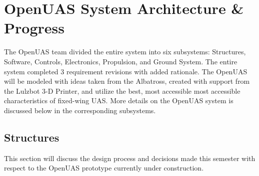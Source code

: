 \documentclass{article}
\begin{document}
\section{OpenUAS System Architecture \& Progress}
\noindent The OpenUAS team divided the entire system into six subsystems: Structures, Software, Controls, Electronics, Propulsion, and Ground System. The entire system completed 3 requirement revisions with added rationale. The OpenUAS will be modeled with ideas taken from the Albatross, created with support from the Lulzbot 3-D Printer, and utilize the best, most accessible most accessible characteristics of fixed-wing UAS. More details on the OpenUAS system is discussed below in the corresponding subsystems. \\

\subsection{Structures}
This section will discuss the design process and decisions made this semester with respect to the OpenUAS prototype currently under construction.
\end{document}
